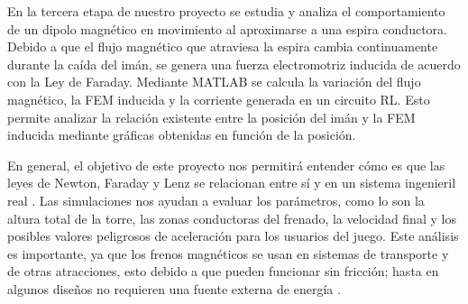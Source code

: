 \tab En la tercera etapa de nuestro proyecto se estudia y analiza el comportamiento de un dipolo magnético en movimiento al aproximarse a una espira conductora. Debido a que el flujo magnético que atraviesa la espira cambia continuamente durante la caída del imán, se genera una fuerza electromotriz inducida de acuerdo con la Ley de Faraday. Mediante MATLAB se calcula la variación del flujo magnético, la FEM inducida y la corriente generada en un circuito RL. Esto permite analizar la relación existente entre la posición del imán y la FEM inducida mediante gráficas obtenidas en función de la posición.

\tab En general, el objetivo de este proyecto nos permitirá entender cómo es que las leyes de Newton, Faraday y Lenz se relacionan entre sí y en un sistema ingenieril real \cite{physlabs2024magnetic}. Las simulaciones nos ayudan a evaluar los parámetros, como lo son la altura total de la torre, las zonas conductoras del frenado, la velocidad final y los posibles valores peligrosos de aceleración para los usuarios del juego. Este análisis es importante, ya que los frenos magnéticos se usan en sistemas de transporte y de otras atracciones, esto debido a que pueden funcionar sin fricción; hasta en algunos diseños no requieren una fuente externa de energía \cite{forrister2019how}. 
